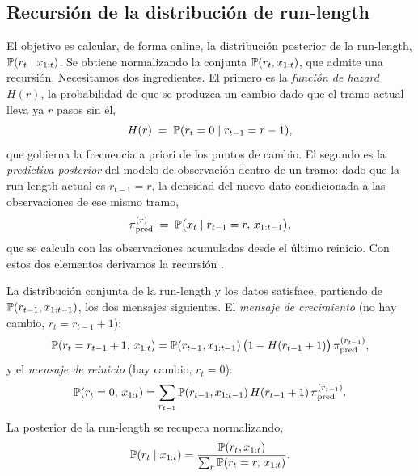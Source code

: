 \subsection{Recursión de la distribución de run-length}
\label{sec:bocpd-recursion}

El objetivo es calcular, de forma online, la distribución posterior de la run-length, $\mathbb{P}(r_t \mid x_{1:t})$. Se obtiene normalizando la conjunta $\mathbb{P}(r_t, x_{1:t})$, que admite una recursión. Necesitamos dos ingredientes. El primero es la \emph{función de hazard} $H(r)$, la probabilidad de que se produzca un cambio dado que el tramo actual lleva ya $r$ pasos sin él,
\[
H(r) \;=\; \mathbb{P}(r_t = 0 \mid r_{t-1} = r - 1),
\]
que gobierna la frecuencia a priori de los puntos de cambio. El segundo es la \emph{predictiva posterior} del modelo de observación dentro de un tramo: dado que la run-length actual es $r_{t-1} = r$, la densidad del nuevo dato condicionada a las observaciones de ese mismo tramo,
\[
\pi^{(r)}_{\mathrm{pred}} \;=\; \mathbb{P}\big(x_t \mid r_{t-1} = r,\, x_{1:t-1}\big),
\]
que se calcula con las observaciones acumuladas desde el último reinicio. Con estos dos elementos derivamos la recursión \cite{adams2007}.

\begin{proposicion}
\label{prop:bocpd}
La distribución conjunta de la run-length y los datos satisface, partiendo de $\mathbb{P}(r_{t-1}, x_{1:t-1})$, los dos mensajes siguientes. El \emph{mensaje de crecimiento} (no hay cambio, $r_t = r_{t-1} + 1$):
\[
\mathbb{P}(r_t = r_{t-1} + 1,\, x_{1:t})
= \mathbb{P}(r_{t-1}, x_{1:t-1})\,\big(1 - H(r_{t-1} + 1)\big)\,\pi^{(r_{t-1})}_{\mathrm{pred}},
\]
y el \emph{mensaje de reinicio} (hay cambio, $r_t = 0$):
\[
\mathbb{P}(r_t = 0,\, x_{1:t})
= \sum_{r_{t-1}} \mathbb{P}(r_{t-1}, x_{1:t-1})\, H(r_{t-1} + 1)\, \pi^{(r_{t-1})}_{\mathrm{pred}}.
\]
La posterior de la run-length se recupera normalizando,
\[
\mathbb{P}(r_t \mid x_{1:t}) = \frac{\mathbb{P}(r_t, x_{1:t})}{\sum_{r} \mathbb{P}(r_t = r,\, x_{1:t})}.
\]
\end{proposicion}

